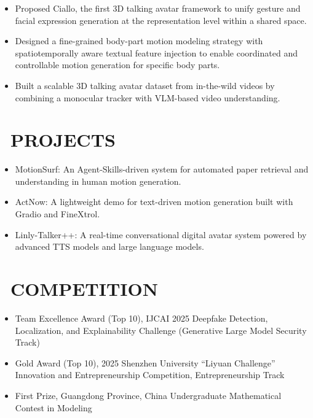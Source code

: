\documentclass{resume}
\begin{document}
\begin{itemize}
  \item Proposed Ciallo, the first 3D talking avatar framework to unify gesture and facial expression generation at the representation level within a shared space.
  \item Designed a fine-grained body-part motion modeling strategy with spatiotemporally aware textual feature injection to enable coordinated and controllable motion generation for specific body parts.
  \item Built a scalable 3D talking avatar dataset from in-the-wild videos by combining a monocular tracker with VLM-based video understanding.
\end{itemize}

\newpage
\section{\texorpdfstring {\faFlask  \ PROJECTS}{PROJECTS}}
\begin{itemize}
  \item MotionSurf: An Agent-Skills-driven system for automated paper retrieval and understanding in human motion generation.
  \item ActNow: A lightweight demo for text-driven motion generation built with Gradio and FineXtrol.
  \item Linly-Talker++: A real-time conversational digital avatar system powered by advanced TTS models and large language models.
\end{itemize}

\section{\texorpdfstring {\faTrophy \ COMPETITION }{COMPETITION}}
\begin{itemize}
  \item Team Excellence Award (Top 10), IJCAI 2025 Deepfake Detection, Localization, and Explainability Challenge (Generative Large Model Security Track)
  \item Gold Award (Top 10), 2025 Shenzhen University ``Liyuan Challenge'' Innovation and Entrepreneurship Competition, Entrepreneurship Track
  \item First Prize, Guangdong Province, China Undergraduate Mathematical Contest in Modeling
\end{itemize}
\end{document}
